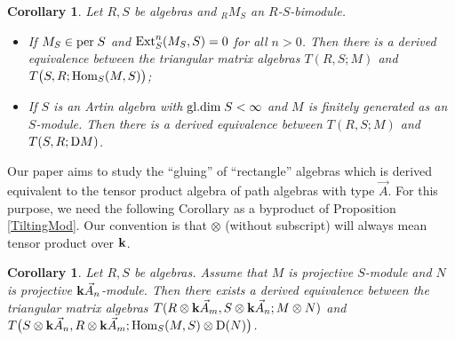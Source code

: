 \documentclass[a4paper, reqno]{amsart}
\newtheorem{cor}[thm]{Corollary}
\theoremstyle{definition}
\theoremstyle{remark}
\numberwithin{equation}{section}
\begin{document}
\begin{cor} \textup{\cite[Corollary 4.9 and 4.11]{Lad2011}}
Let $R,S$ be algebras and ${_R}M_S$ an $R$-$S$-bimodule.
\begin{itemize}
    \item[(1)] If $M_S\in\textup{per}\;S$ and $\textup{Ext}^n_S(M_S,S)=0$ for all $n>0$. Then there is a derived equivalence between the triangular matrix algebras $T(R,S;M)$ and $T\big(S,R;\textup{Hom}{_S}(M,S)\big)$;
    \item[(2)] If $S$ is an Artin algebra with $\textup{gl.dim}\;S<\infty$ and $M$ is finitely generated as an $S$-module. Then there is a derived equivalence between $T(R,S;M)$ and $T(S,R;\textup{D}M)$.
\end{itemize}
\end{cor}

Our paper aims to study the ``gluing'' of ``rectangle'' algebras which is derived equivalent to the tensor product algebra of path algebras with type $\vec{A}$. For this purpose, we need the following Corollary as a byproduct of Proposition \ref{TiltingMod}. Our convention is that $\otimes$ (without subscript) will always mean tensor product over ${\bf k}$.

\begin{cor}\label{derOfTri3}
Let $R,S$ be algebras. Assume that $M$ is projective $S$-module and $N$ is projective ${\bf k}\vec{A}_n$-module. Then there exists a derived equivalence between the triangular matrix algebras $T(R\otimes{\bf k}\vec{A}_m,S\otimes{\bf k}\vec{A}_n;M\otimes N)$ and $T\big(S\otimes{\bf k}\vec{A}_n,R\otimes{\bf k}\vec{A}_m;\textup{Hom}_{S}(M,S)\otimes\textup{D}(N)\big)$.    
\end{cor}
\end{document}
